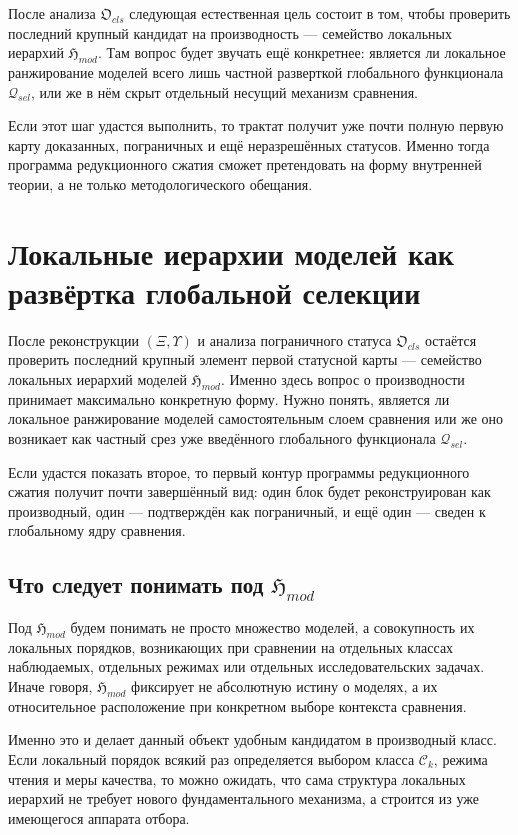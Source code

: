 \documentclass[12pt,a4paper]{article}
\begin{document}
После анализа \(\mathfrak{O}_{cls}\) следующая естественная цель состоит в том, чтобы проверить последний крупный кандидат на производность --- семейство локальных иерархий \(\mathfrak{H}_{mod}\). Там вопрос будет звучать ещё конкретнее: является ли локальное ранжирование моделей всего лишь частной разверткой глобального функционала \(\mathcal{Q}_{sel}\), или же в нём скрыт отдельный несущий механизм сравнения.

Если этот шаг удастся выполнить, то трактат получит уже почти полную первую карту доказанных, пограничных и ещё неразрешённых статусов. Именно тогда программа редукционного сжатия сможет претендовать на форму внутренней теории, а не только методологического обещания.

\section{Локальные иерархии моделей как развёртка глобальной селекции}

После реконструкции \((\Xi,\Upsilon)\) и анализа пограничного статуса \(\mathfrak{O}_{cls}\) остаётся проверить последний крупный элемент первой статусной карты --- семейство локальных иерархий моделей \(\mathfrak{H}_{mod}\). Именно здесь вопрос о производности принимает максимально конкретную форму. Нужно понять, является ли локальное ранжирование моделей самостоятельным слоем сравнения или же оно возникает как частный срез уже введённого глобального функционала \(\mathcal{Q}_{sel}\).

Если удастся показать второе, то первый контур программы редукционного сжатия получит почти завершённый вид: один блок будет реконструирован как производный, один --- подтверждён как пограничный, и ещё один --- сведен к глобальному ядру сравнения.

\subsection{Что следует понимать под \texorpdfstring{$\mathfrak{H}_{mod}$}{Hmod}}

Под \(\mathfrak{H}_{mod}\) будем понимать не просто множество моделей, а совокупность их локальных порядков, возникающих при сравнении на отдельных классах наблюдаемых, отдельных режимах или отдельных исследовательских задачах. Иначе говоря, \(\mathfrak{H}_{mod}\) фиксирует не абсолютную истину о моделях, а их относительное расположение при конкретном выборе контекста сравнения.

Именно это и делает данный объект удобным кандидатом в производный класс. Если локальный порядок всякий раз определяется выбором класса \(\mathcal{C}_k\), режима чтения и меры качества, то можно ожидать, что сама структура локальных иерархий не требует нового фундаментального механизма, а строится из уже имеющегося аппарата отбора.
\end{document}
